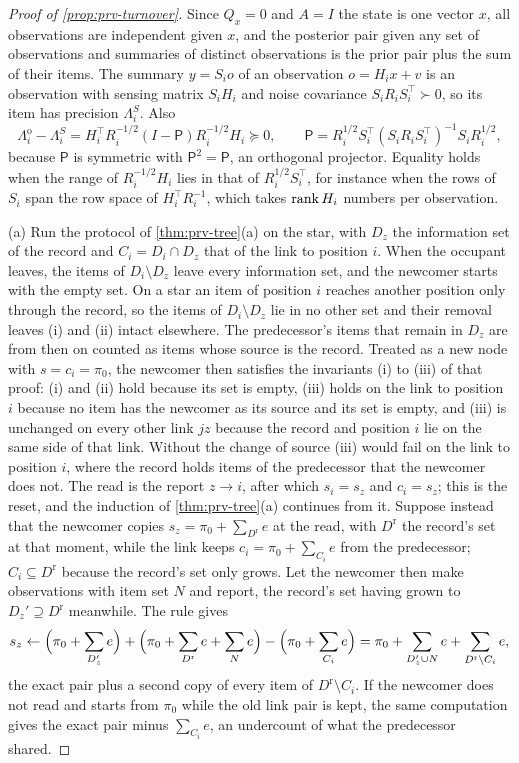 \begin{proof}[Proof of \cref{prop:prv-turnover}]
Since $Q_x=0$ and $A=I$ the state is one vector $x$, all observations are independent given $x$, and the posterior pair given any set of observations and summaries of distinct observations is the prior pair plus the sum of their items. The summary $y=S_io$ of an observation $o=H_ix+v$ is an observation with sensing matrix $S_iH_i$ and noise covariance $S_iR_iS_i^\top\succ0$, so its item has precision $\Lambda^S_i$. Also
\[
\Lambda^{\mathrm o}_i-\Lambda^S_i=H_i^\top R_i^{-1/2}(I-\mathsf P)R_i^{-1/2}H_i\succeq0,\qquad\mathsf P=R_i^{1/2}S_i^\top(S_iR_iS_i^\top)^{-1}S_iR_i^{1/2},
\]
because $\mathsf P$ is symmetric with $\mathsf P^2=\mathsf P$, an orthogonal projector. Equality holds when the range of $R_i^{-1/2}H_i$ lies in that of $R_i^{1/2}S_i^\top$, for instance when the rows of $S_i$ span the row space of $H_i^\top R_i^{-1}$, which takes $\operatorname{rank} H_i$ numbers per observation.

(a) Run the protocol of \cref{thm:prv-tree}(a) on the star, with $D_z$ the information set of the record and $C_i=D_i\cap D_z$ that of the link to position $i$. When the occupant leaves, the items of $D_i\setminus D_z$ leave every information set, and the newcomer starts with the empty set. On a star an item of position $i$ reaches another position only through the record, so the items of $D_i\setminus D_z$ lie in no other set and their removal leaves (i) and (ii) intact elsewhere. The predecessor's items that remain in $D_z$ are from then on counted as items whose source is the record. Treated as a new node with $s=c_i=\pi_0$, the newcomer then satisfies the invariants (i) to (iii) of that proof: (i) and (ii) hold because its set is empty, (iii) holds on the link to position $i$ because no item has the newcomer as its source and its set is empty, and (iii) is unchanged on every other link $jz$ because the record and position $i$ lie on the same side of that link. Without the change of source (iii) would fail on the link to position $i$, where the record holds items of the predecessor that the newcomer does not. The read is the report $z\to i$, after which $s_i=s_z$ and $c_i=s_z$; this is the reset, and the induction of \cref{thm:prv-tree}(a) continues from it. Suppose instead that the newcomer copies $s_z=\pi_0+\sum_{D^{\mathrm r}}e$ at the read, with $D^{\mathrm r}$ the record's set at that moment, while the link keeps $c_i=\pi_0+\sum_{C_i}e$ from the predecessor; $C_i\subseteq D^{\mathrm r}$ because the record's set only grows. Let the newcomer then make observations with item set $N$ and report, the record's set having grown to $D_z'\supseteq D^{\mathrm r}$ meanwhile. The rule gives
\[
s_z\leftarrow\Bigl(\pi_0+\sum_{D_z'}e\Bigr)+\Bigl(\pi_0+\sum_{D^{\mathrm r}}e+\sum_Ne\Bigr)-\Bigl(\pi_0+\sum_{C_i}e\Bigr)=\pi_0+\sum_{D_z'\cup N}e+\sum_{D^{\mathrm r}\setminus C_i}e,
\]
the exact pair plus a second copy of every item of $D^{\mathrm r}\setminus C_i$. If the newcomer does not read and starts from $\pi_0$ while the old link pair is kept, the same computation gives the exact pair minus $\sum_{C_i}e$, an undercount of what the predecessor shared.


\end{proof}
